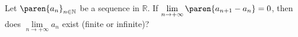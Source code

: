 Let ${\paren{a_n}}_{n \in \mathbb{N}}$ be a sequence in $\mathbb{R}$.
If $\displaystyle{\lim\limits_{n \to + \infty} {\paren{a_{n+1} - a_n}} = 0}$,
then does $\displaystyle{\lim\limits_{n \to + \infty} {a_n}}$ exist (finite or infinite)?
